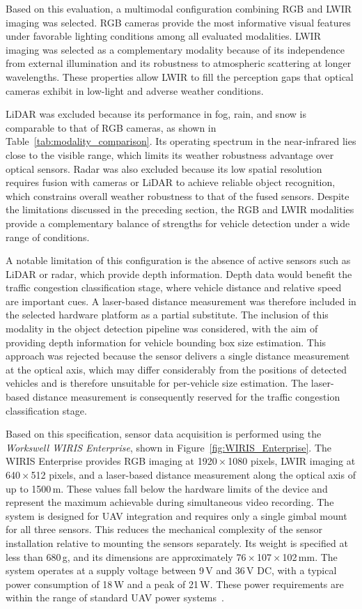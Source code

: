 \documentclass[12pt,oneside,bibtotoc,liststotoc]{scrbook}
\begin{document}
Based on this evaluation, a multimodal configuration combining
RGB and LWIR imaging was selected. RGB cameras provide the most
informative visual features under favorable lighting conditions
among all evaluated modalities.
LWIR imaging was selected as a complementary modality because of
its independence from external illumination and its robustness to
atmospheric scattering at longer wavelengths.
These properties allow LWIR to fill the perception gaps that optical
cameras exhibit in low-light and adverse weather conditions.

LiDAR was excluded because its performance in fog, rain, and snow is
comparable to that of RGB cameras, as shown in
Table~\ref{tab:modality_comparison}.
Its operating spectrum in the near-infrared lies close to the visible
range, which limits its weather robustness advantage over optical sensors.
Radar was also excluded because its low spatial resolution requires
fusion with cameras or LiDAR to achieve reliable object recognition,
which constrains overall weather robustness to that of the fused sensors.
Despite the limitations discussed in the preceding section, the RGB and
LWIR modalities provide a complementary balance of strengths for vehicle
detection under a wide range of conditions.

A notable limitation of this configuration is the absence of active
sensors such as LiDAR or radar, which provide depth information.
Depth data would benefit the traffic congestion classification stage, where
vehicle distance and relative speed are important cues.
A laser-based distance measurement was therefore included in the selected
hardware platform as a partial substitute.
The inclusion of this modality in the object detection pipeline was
considered, with the aim of providing depth information for vehicle
bounding box size estimation.
This approach was rejected because the sensor delivers a single distance
measurement at the optical axis, which may differ considerably from the
positions of detected vehicles and is therefore unsuitable for per-vehicle
size estimation.
The laser-based distance measurement is consequently reserved for the
traffic congestion classification stage.

Based on this specification, sensor data acquisition is performed using the
\textit{Workswell WIRIS Enterprise}, shown in Figure~\ref{fig:WIRIS_Enterprise}.
The WIRIS Enterprise provides RGB imaging at 1920\,×\,1080 pixels,
LWIR imaging at 640\,×\,512 pixels, and a laser-based distance measurement
along the optical axis of up to 1500\,m.
These values fall below the hardware limits of the device and represent
the maximum achievable during simultaneous video recording.
The system is designed for UAV integration and requires only a single
gimbal mount for all three sensors.
This reduces the mechanical complexity of the sensor installation relative
to mounting the sensors separately.
Its weight is specified at less than 680\,g, and its dimensions are
approximately 76\,×\,107\,×\,102\,mm.
The system operates at a supply voltage between 9\,V and 36\,V DC, with
a typical power consumption of 18\,W and a peak of 21\,W.
These power requirements are within the range of standard UAV power
systems~\cite{worksellWIRISspec2022}.
\end{document}
